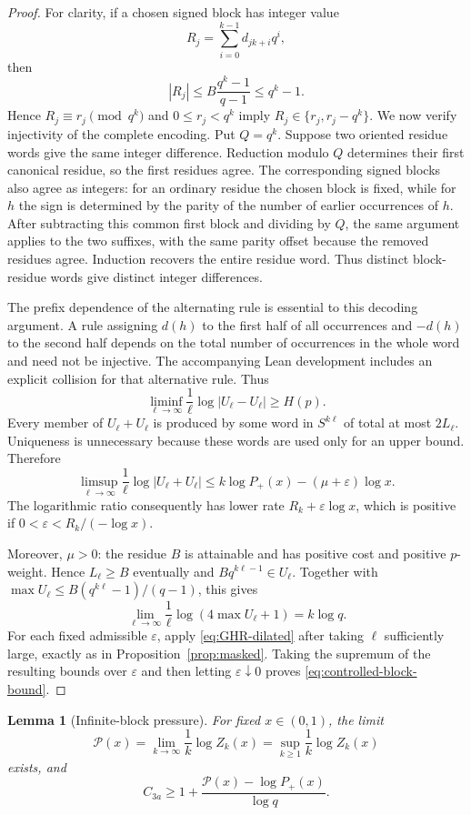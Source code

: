 \documentclass[11pt]{article}
\newtheorem{lemma}[proposition]{Lemma}
\newcommand{\card}[1]{\lvert #1\rvert}
\begin{document}
\begin{proof}
For clarity, if a chosen signed block has integer value
\[
 R_j=\sum_{i=0}^{k-1}d_{jk+i}q^i,
\]
then
\[
 |R_j|\le B\frac{q^k-1}{q-1}\le q^k-1.
\]
Hence $R_j\equiv r_j\pmod{q^k}$ and $0\le r_j<q^k$ imply
$R_j\in\{r_j,r_j-q^k\}$.  We now verify injectivity of the complete
encoding.  Put $Q=q^k$.  Suppose two oriented residue words give the same
integer difference.  Reduction modulo $Q$ determines their first canonical
residue, so the first residues agree.  The corresponding signed blocks also
agree as integers: for an ordinary residue the chosen block is fixed, while
for $h$ the sign is determined by the parity of the number of earlier
occurrences of $h$.  After subtracting this common first block and dividing
by $Q$, the same argument applies to the two suffixes, with the same parity
offset because the removed residues agree.  Induction recovers the entire
residue word.  Thus distinct block-residue words give distinct integer
differences.

The prefix dependence of the alternating rule is essential to this decoding
argument.  A rule assigning $d(h)$ to the first half of all occurrences and
$-d(h)$ to the second half depends on the total number of occurrences in the
whole word and need not be injective.  The accompanying Lean development
includes an explicit collision for that alternative rule.
Thus
\[
 \liminf_{\ell\to\infty}\frac1\ell\log\card{U_\ell-U_\ell}\ge H(p).
\]
Every member of $U_\ell+U_\ell$ is produced by some word in $S^{k\ell}$ of
total at most $2L_\ell$.  Uniqueness is unnecessary because these words are
used only for an upper bound.  Therefore
\[
 \limsup_{\ell\to\infty}\frac1\ell\log\card{U_\ell+U_\ell}
 \le k\log P_+(x)-(\mu+\varepsilon)\log x.
\]
The logarithmic ratio consequently has lower rate
$R_k+\varepsilon\log x$, which is positive if
$0<\varepsilon<R_k/(-\log x)$.

Moreover, $\mu>0$: the residue $B$ is attainable and has positive cost and
positive $p$-weight.  Hence $L_\ell\ge B$ eventually and
$Bq^{k\ell-1}\in U_\ell$.  Together with
$\max U_\ell\le B(q^{k\ell}-1)/(q-1)$, this gives
\[
 \lim_{\ell\to\infty}\frac1\ell\log(4\max U_\ell+1)=k\log q.
\]
For each fixed admissible $\varepsilon$, apply
\eqref{eq:GHR-dilated} after taking $\ell$ sufficiently large, exactly as in
Proposition~\ref{prop:masked}.  Taking the supremum of the resulting bounds
over $\varepsilon$ and then letting $\varepsilon\downarrow0$ proves
\eqref{eq:controlled-block-bound}.
\end{proof}

\begin{lemma}[Infinite-block pressure]\label{lem:controlled-pressure}
For fixed $x\in(0,1)$, the limit
\[
 \mathcal P(x)=\lim_{k\to\infty}\frac1k\log Z_k(x)
 =\sup_{k\ge1}\frac1k\log Z_k(x)
\]
exists, and
\begin{equation}\label{eq:controlled-limit-bound}
 C_{3a}\ge1+\frac{\mathcal P(x)-\log P_+(x)}{\log q}.
\end{equation}
\end{lemma}
\end{document}

